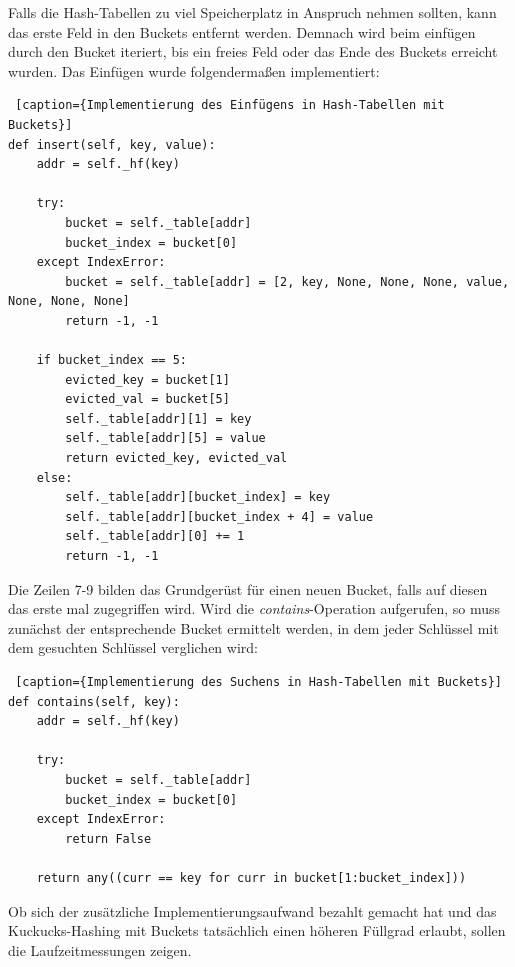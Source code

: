Falls die Hash-Tabellen zu viel Speicherplatz in Anspruch nehmen sollten, kann das erste Feld in den Buckets entfernt werden. Demnach wird beim einfügen durch den Bucket iteriert, bis ein freies Feld oder das Ende des Buckets erreicht wurden.
\newpage
Das Einfügen wurde folgendermaßen implementiert:
\begin{lstlisting} [caption={Implementierung des Einfügens in Hash-Tabellen mit Buckets}]
def insert(self, key, value):
    addr = self._hf(key)

    try:
        bucket = self._table[addr]
        bucket_index = bucket[0]
    except IndexError:
        bucket = self._table[addr] = [2, key, None, None, None, value, None, None, None]
        return -1, -1

    if bucket_index == 5:
        evicted_key = bucket[1]
        evicted_val = bucket[5]
        self._table[addr][1] = key
        self._table[addr][5] = value
        return evicted_key, evicted_val
    else:
        self._table[addr][bucket_index] = key
        self._table[addr][bucket_index + 4] = value
        self._table[addr][0] += 1
        return -1, -1      
\end{lstlisting}
Die Zeilen 7-9 bilden das Grundgerüst für einen neuen Bucket, falls auf diesen das erste mal zugegriffen wird.
\newpage
Wird die \textit{contains}-Operation aufgerufen, so muss zunächst der entsprechende Bucket ermittelt werden, in dem jeder Schlüssel mit dem gesuchten Schlüssel verglichen wird:
\begin{lstlisting} [caption={Implementierung des Suchens in Hash-Tabellen mit Buckets}]
def contains(self, key):
    addr = self._hf(key)

    try:
        bucket = self._table[addr]
        bucket_index = bucket[0]
    except IndexError:
        return False

    return any((curr == key for curr in bucket[1:bucket_index]))  
\end{lstlisting}
Ob sich der zusätzliche Implementierungsaufwand bezahlt gemacht hat und das Kuckucks-Hashing mit Buckets tatsächlich einen höheren Füllgrad erlaubt, sollen die Laufzeitmessungen zeigen.

